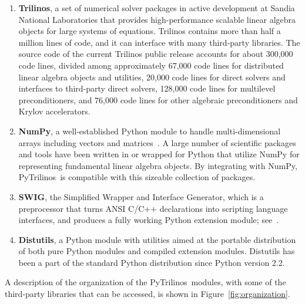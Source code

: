 \documentclass[acmtocl]{acmtrans2m}
\newcommand{\PyTrilinos}{{PyTrilinos}}
\begin{document}
\begin{enumerate}

\item {\bf Trilinos}, a set of numerical solver packages in active
  development at Sandia National Laboratories that provides
  high-performance scalable linear algebra objects for large systems
  of equations.  Trilinos contains more than half a million lines of
  code, and it can interface with many third-party libraries.  The
  source code of the current Trilinos public release accounts for
  about 300,000 code lines, divided among approximately 67,000 code
  lines for distributed linear algebra objects and utilities, 20,000
  code lines for direct solvers and interfaces to third-party direct
  solvers, 128,000 code lines for multilevel preconditioners, and
  76,000 code lines for other algebraic preconditioners and Krylov
  accelerators.

\item {\bf NumPy}, a well-established Python module to handle
  multi-dimensional arrays including vectors and
  matrices~\cite{numpy}.  A large number of scientific packages and
  tools have been written in or wrapped for Python that utilize NumPy
  for representing fundamental linear algebra objects.  By integrating
  with NumPy, \PyTrilinos\ is compatible with this sizeable collection
  of packages.

\item {\bf SWIG}, the Simplified Wrapper and Interface Generator,
  which is a preprocessor that turns ANSI C/C++ declarations into
  scripting language interfaces, and produces a fully working Python
  extension module; see~\cite{swig}.

\item {\bf Distutils}, a Python module with utilities aimed at the
  portable distribution of both pure Python modules and compiled
  extension modules.  Distutils has been a part of the standard Python
  distribution since Python version 2.2.

\end{enumerate}

A description of the organization of the \PyTrilinos\ modules, with
some of the third-party libraries that can be accessed, is shown in
Figure~\ref{fig:organization}.
\end{document}
